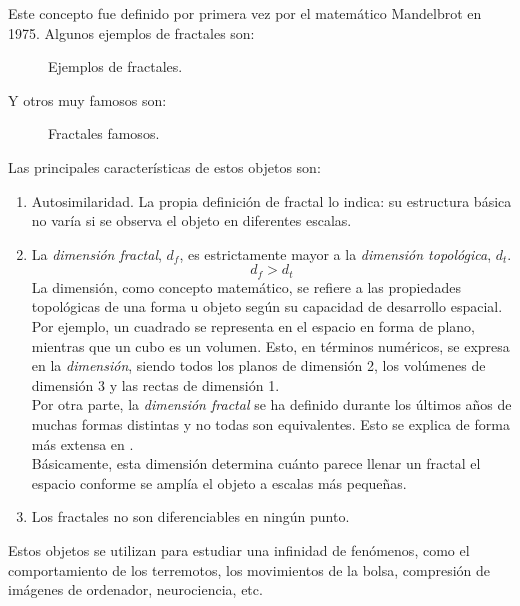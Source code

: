 \documentclass[a4paper, openright, 11pt, titlepage]{report}
\theoremstyle{definition}\newtheorem{defin}[propo]{Definition}
\theoremstyle{definition}\newtheorem{obser}[propo]{Remark}
\theoremstyle{definition}\newtheorem{ejem}[propo]{Ejemplo}
\theoremstyle{definition}\newtheorem{algoritmo}[propo]{Algoritmo}
\begin{document}
\begin{itemize}
    Este concepto fue definido por primera vez por el matemático Mandelbrot en 1975. Algunos ejemplos de fractales son:
    \begin{figure}[H]
        \centering
         \hspace{1.7cm}
        \caption{Ejemplos de fractales.}
    \end{figure}
    Y otros muy famosos son:
    \begin{figure}[H]
        \centering
         \hspace{1.7cm}
        \caption{Fractales famosos.}
    \end{figure}
    Las principales características de estos objetos son:
    \begin{enumerate}
        \item Autosimilaridad. La propia definición de fractal lo indica: su estructura básica no varía si se observa el objeto en diferentes escalas.
        \item La \textit{dimensión fractal}, $d_{f}$, es estrictamente mayor a la \textit{dimensión topológica}, $d_{t}$.
        $$d_{f} > d_{t}$$
        La dimensión, como concepto matemático, se refiere a las propiedades topológicas de una forma u objeto según su capacidad de desarrollo espacial. Por ejemplo, un cuadrado se representa en el espacio en forma de plano, mientras que un cubo es un volumen. Esto, en términos numéricos, se expresa en la \textit{dimensión}, siendo todos los planos de dimensión 2, los volúmenes de dimensión 3 y las rectas de dimensión 1.\\
        Por otra parte, la \textit{dimensión fractal} se ha definido durante los últimos años de muchas formas distintas y no todas son equivalentes. Esto se explica de forma más extensa en \cite{fractales}.\\
        Básicamente, esta dimensión determina cuánto parece llenar un fractal el espacio conforme se amplía el objeto a escalas más pequeñas.
        \item Los fractales no son diferenciables en ningún punto.
    \end{enumerate}
    Estos objetos se utilizan para estudiar una infinidad de fenómenos, como el comportamiento de los terremotos, los movimientos de la bolsa, compresión de imágenes de ordenador, neurociencia, etc.\\

\end{itemize}
\end{document}
